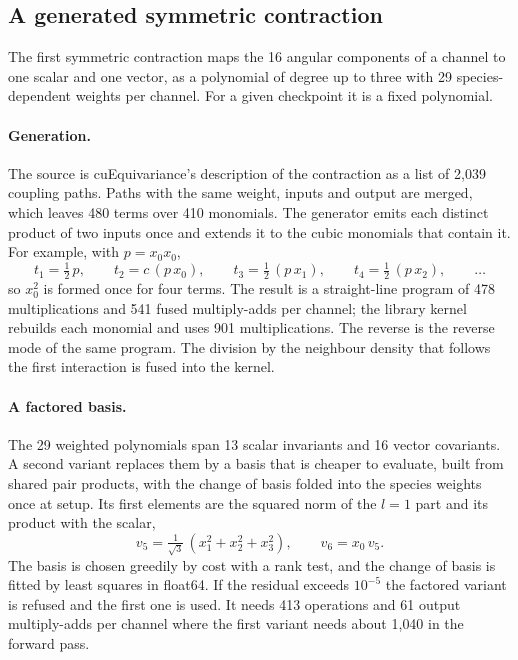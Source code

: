 \documentclass[11pt]{article}
\begin{document}
\subsection{A generated symmetric contraction}
\label{sec:contraction}

The first symmetric contraction maps the 16 angular components of a channel to one scalar and one vector, as a
polynomial of degree up to three with 29 species-dependent weights per channel. For a given checkpoint it is a
fixed polynomial.

\paragraph{Generation.}
The source is cuEquivariance's description of the contraction as a list of 2{,}039 coupling paths. Paths with the
same weight, inputs and output are merged, which leaves 480 terms over 410 monomials. The generator emits each
distinct product of two inputs once and extends it to the cubic monomials that contain it. For example, with
$p = x_0 x_0$,
\begin{equation}
t_1 = \tfrac12\,p, \qquad t_2 = c\,(p\,x_0), \qquad t_3 = \tfrac12\,(p\,x_1), \qquad t_4 = \tfrac12\,(p\,x_2),
\qquad \dots
\end{equation}
so $x_0^2$ is formed once for four terms. The result is a straight-line program of 478 multiplications and 541
fused multiply-adds per channel; the library kernel rebuilds each monomial and uses 901 multiplications. The
reverse is the reverse mode of the same program. The division by the neighbour density that follows the first
interaction is fused into the kernel.

\paragraph{A factored basis.}
The 29 weighted polynomials span 13 scalar invariants and 16 vector covariants. A second variant replaces them by
a basis that is cheaper to evaluate, built from shared pair products, with the change of basis folded into the
species weights once at setup. Its first elements are the squared norm of the $l{=}1$ part and its product with
the scalar,
\begin{equation}
v_5 = \tfrac{1}{\sqrt3}\,(x_1^2 + x_2^2 + x_3^2), \qquad v_6 = x_0\,v_5 .
\end{equation}
The basis is chosen greedily by cost with a rank test, and the change of basis is fitted by least squares in
float64. If the residual exceeds $10^{-5}$ the factored variant is refused and the first one is used. It needs
413 operations and 61 output multiply-adds per channel where the first variant needs about 1{,}040 in the
forward pass.
\end{document}
